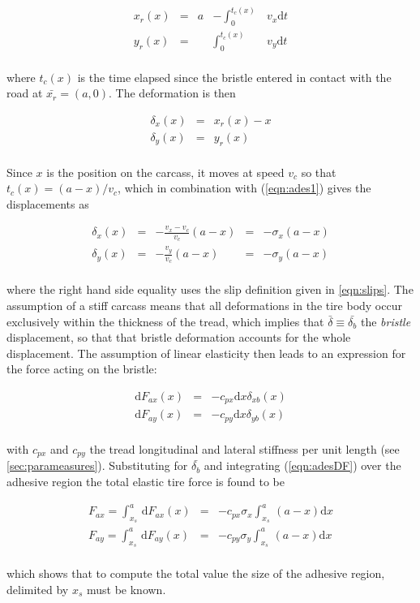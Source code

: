 \documentclass[12pt,a4paper]{report}
\newcommand{\eq}[2]{
\begin{equation} \label{#1}
#2
\end{equation}
}
\newcommand{\req}[1]{
(\ref{#1})
}
\newcommand{\de}[1]{
\mathrm{d} #1 
}
\begin{document}
\eq{eqn:ades1}{
\begin{array}{rcrcl}
x_r(x)  &=& a &\displaystyle -\int_{0}^{t_c(x)} & v_x \de{t} \\
y_r(x)  &=&   &\displaystyle \int_{0}^{t_c(x)} & v_y \de{t} \\
\end{array}
}
where $t_c(x)$ is the time elapsed since the bristle entered in contact with the road at $\bar{x_r}=(a,0)$.
The deformation is then
\eq{eqn:ades2}{
\begin{array}{rcl}
\delta_{x}(x)  &=& x_r(x) - x \\
\delta_{y}(x)  &=& y_r(x) \\
\end{array}
}
Since $x$ is the position on the carcass, it moves at speed $v_c$ so that $t_c(x) = (a-x)/v_c$, which in combination with \req{eqn:ades1} gives the displacements as
\eq{eqn:ades3}{
\begin{array}{rcccl}
\delta_{x}(x)  &=& \displaystyle- \frac{v_x - v_c}{v_c}(a-x) &=& -\sigma_x (a-x) \\
\delta_{y}(x)  &=& \displaystyle- \frac{v_y}{v_c}(a-x) &=& -\sigma_y (a-x) \\
\end{array}
}
where the right hand side equality uses the slip definition given in \ref{eqn:slips}.
The assumption of a stiff carcass \label{stifcarcass} means that all deformations in the tire body occur exclusively within the thickness of the tread, which implies that $\bar{\delta} \equiv \bar{\delta_{b}}$ the \emph{bristle} displacement, so that that bristle deformation accounts for the whole displacement. The assumption of linear elasticity then leads to an expression for the force acting on the bristle:
\eq{eqn:adesDF}{
\begin{array}{rcl}
\de{F_{ax}}(x)  &=& -c_{px} \de{x} \delta_{xb}(x)\\
\de{F_{ay}}(x)  &=& -c_{py} \de{x} \delta_{yb}(x)\\
\end{array}
}
with $c_{px}$ and $c_{py}$ the tread longitudinal and lateral stiffness per unit length (see \ref{sec:parameasures}).
Substituting for $\bar{\delta_b}$ and integrating \req{eqn:adesDF} over the adhesive region the total elastic tire force is found to be
\eq{eqn:adesF}{
\begin{array}{rcl}
F_{ax} = \displaystyle \int_{x_s}^{a} \, \de{F_{ax}}(x)  &=& -c_{px} \sigma_x \int_{x_s}^{a} \, (a-x) \de{x}\\
F_{ay} = \displaystyle \int_{x_s}^{a} \, \de{F_{ay}}(x)  &=& -c_{py} \sigma_y \int_{x_s}^{a} \, (a-x) \de{x}\\
\end{array}
}
which shows that to compute the total value the size of the adhesive region, delimited by $x_s$ must be known.
\end{document}
